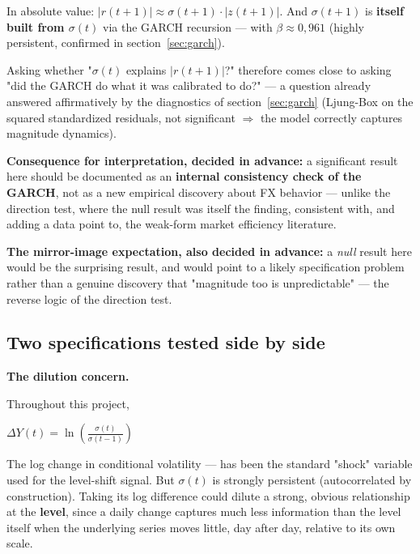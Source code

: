 \documentclass[12pt,a4paper]{article}
\begin{document}
\vspace{0.3cm}

In absolute value: $|r(t+1)| \approx \sigma(t+1)\cdot|z(t+1)|$. And
$\sigma(t+1)$ is \textbf{itself built from $\sigma(t)$}
via the GARCH recursion --- with $\beta \approx 0{,}961$ (highly
persistent, confirmed in section~\ref{sec:garch}). 

Asking whether "$\sigma(t)$
explains $|r(t+1)|$?" therefore comes close to asking
"did the GARCH do what it was calibrated to do?" --- a
question already answered affirmatively by the diagnostics of
section~\ref{sec:garch} (Ljung-Box on the squared standardized
residuals, not significant $\Rightarrow$ the model correctly captures
magnitude dynamics).

\vspace{0.1cm}

\textbf{Consequence for interpretation, decided in advance:} a
significant result here should be documented as an
\textbf{internal consistency check of the GARCH}, not as a
new empirical discovery about FX behavior --- unlike
the direction test, where the null result was itself the finding,
consistent with, and adding a data point to, the weak-form
market efficiency literature.

\vspace{0.1cm}

\textbf{The mirror-image expectation, also decided in advance:} a
\emph{null} result here would be the surprising result, and would point
to a likely specification problem rather than a genuine
discovery that "magnitude too is unpredictable" --- the reverse
logic of the direction test.

\subsection{Two specifications tested side by side}

\textbf{The dilution concern.} 

\vspace{0.3cm}

Throughout this project,

\begin{center}
	
	
	{\large $\Delta Y(t) = \ln\left(\frac{\sigma(t)}{\sigma(t-1)}\right)$}
\end{center}

\vspace{0.3cm}

The log change in conditional volatility --- has been the standard "shock" variable
used for the level-shift signal. But
$\sigma(t)$ is strongly persistent (autocorrelated by construction).
Taking its log difference could dilute a strong, obvious relationship
at the \textbf{level}, since a daily change captures much less
information than the level itself when the underlying series moves
little, day after day, relative to its own scale.
\end{document}
